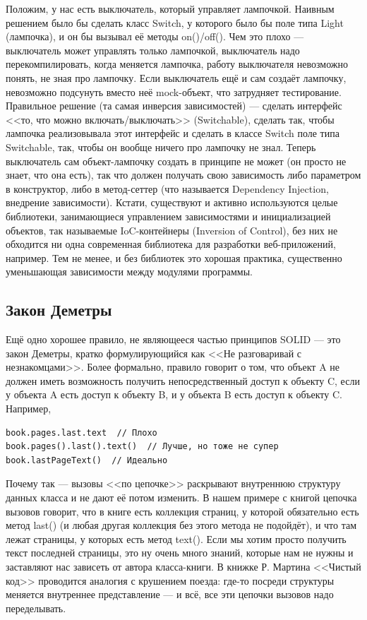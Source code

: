 \documentclass{../../text-style}
\begin{document}
\begin{itemize}
        Положим, у нас есть выключатель, который управляет лампочкой. Наивным решением было бы сделать класс Switch, у которого было бы поле типа Light (лампочка), и он бы вызывал её методы on()/off(). Чем это плохо --- выключатель может управлять только лампочкой, выключатель надо перекомпилировать, когда меняется лампочка, работу выключателя невозможно понять, не зная про лампочку. Если выключатель ещё и сам создаёт лампочку, невозможно подсунуть вместо неё mock-объект, что затрудняет тестирование. Правильное решение (та самая инверсия зависимостей) --- сделать интерфейс <<то, что можно включать/выключать>> (Switchable), сделать так, чтобы лампочка реализовывала этот интерфейс и сделать в классе Switch поле типа Switchable, так, чтобы он вообще ничего про лампочку не знал. Теперь выключатель сам объект-лампочку создать в принципе не может (он просто не знает, что она есть), так что должен получать свою зависимость либо параметром в конструктор, либо в метод-сеттер (что называется Dependency Injection, внедрение зависимости). Кстати, существуют и активно используются целые библиотеки, занимающиеся управлением зависимостями и инициализацией объектов, так называемые IoC-контейнеры (Inversion of Control), без них не обходится ни одна современная библиотека для разработки веб-приложений, например. Тем не менее, и без библиотек это хорошая практика, существенно уменьшающая зависимости между модулями программы.
\end{itemize}

\subsection{Закон Деметры}

Ещё одно хорошее правило, не являющееся частью принципов SOLID --- это закон Деметры, кратко формулирующийся как <<Не разговаривай с незнакомцами>>. Более формально, правило говорит о том, что объект A не должен иметь возможность получить непосредственный доступ к объекту C, если у объекта A есть доступ к объекту B, и у объекта B есть доступ к объекту C. Например,

\begin{verbatim}
book.pages.last.text  // Плохо
book.pages().last().text()  // Лучше, но тоже не супер
book.lastPageText()  // Идеально
\end{verbatim}

Почему так --- вызовы <<по цепочке>> раскрывают внутреннюю структуру данных класса и не дают её потом изменить. В нашем примере с книгой цепочка вызовов говорит, что в книге есть коллекция страниц, у которой обязательно есть метод last() (и любая другая коллекция без этого метода не подойдёт), и что там лежат страницы, у которых есть метод text(). Если мы хотим просто получить текст последней страницы, это ну очень много знаний, которые нам не нужны и заставляют нас зависеть от автора класса-книги. В книжке Р. Мартина <<Чистый код>> проводится аналогия с крушением поезда: где-то посреди структуры меняется внутреннее представление --- и всё, все эти цепочки вызовов надо переделывать.
\end{document}
